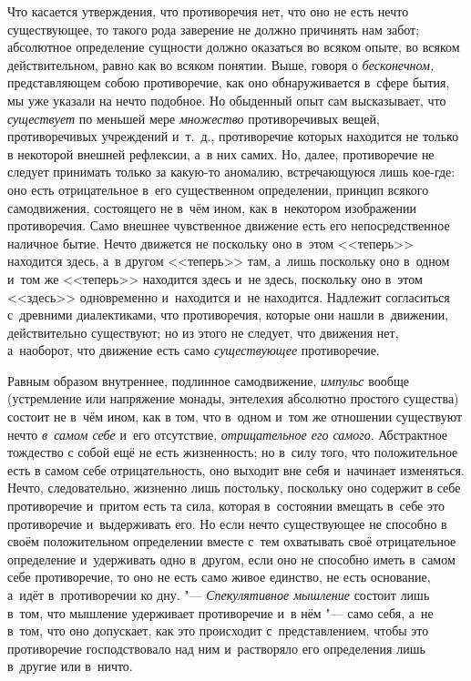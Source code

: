 Что касается утверждения, что противоречия нет, что оно не есть нечто
существующее, то такого рода заверение не должно причинять нам забот;
абсолютное определение сущности должно оказаться во всяком опыте, во всяком
действительном, равно как во всяком понятии. Выше, говоря о
{\em бесконечном,} представляющем собою противоречие,
как оно обнаруживается в~сфере бытия, мы уже указали на нечто подобное. Но
обыденный опыт сам высказывает, что {\em существует} по
меньшей мере {\em множество} противоречивых вещей,
противоречивых учреждений и~т.~д., противоречие которых находится не только
в некоторой внешней рефлексии, а~в них самих. Но, далее, противоречие не
следует принимать только за какую-то аномалию, встречающуюся лишь кое-где:
оно есть отрицательное в~его существенном определении, принцип всякого
самодвижения, состоящего не в~чём ином, как в~некотором изображении
противоречия. Само внешнее чувственное движение есть его непосредственное
наличное бытие. Нечто движется не поскольку оно в~этом <<теперь>> находится
здесь, а~в другом <<теперь>> там, а~лишь поскольку оно в~одном и~том же
<<теперь>> находится здесь и~не здесь, поскольку оно в~этом <<здесь>>
одновременно и~находится и~не находится. Надлежит согласиться с~древними
диалектиками, что противоречия, которые они нашли в~движении, действительно
существуют; но из этого не следует, что движения нет, а~наоборот, что
движение есть само {\em существующее} противоречие.

Равным образом внутреннее, подлинное самодвижение,
{\em импульс} вообще (устремление или напряжение
монады, энтелехия абсолютно простого существа) состоит не в~чём ином, как в
том, что в~одном и~том же отношении существуют нечто
{\em в~самом себе} и~его отсутствие,
{\em отрицательное его самого}. Абстрактное тождество с
собой ещё не есть жизненность; но в~силу того, что положительное есть в
самом себе отрицательность, оно выходит вне себя и~начинает изменяться.
Нечто, следовательно, жизненно лишь постольку, поскольку оно содержит в
себе противоречие и~притом есть та сила, которая в~состоянии вмещать в~себе
это противоречие и~выдерживать его. Но если нечто существующее не способно
в своём положительном определении вместе с~тем охватывать своё
отрицательное определение и~удерживать одно в~другом, если оно не способно
иметь в~самом себе противоречие, то оно не есть само живое единство, не
есть основание, а~идёт в~противоречии ко дну. "---
{\em Спекулятивное мышление} состоит лишь в~том, что
мышление удерживает противоречие и~в нём "--- само себя, а~не в~том, что оно
допускает, как это происходит с~представлением, чтобы это противоречие
господствовало над ним и~растворяло его определения лишь в~другие или в~ничто.


